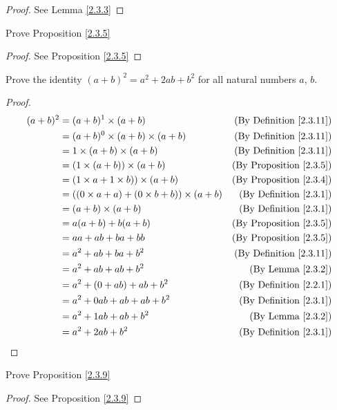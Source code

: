 \begin{proof}
See Lemma \ref{2.3.3}
\end{proof}

\begin{exercise}\label{ex 2.3.3}
Prove Proposition \ref{2.3.5}
\end{exercise}

\begin{proof}
See Proposition \ref{2.3.5}
\end{proof}

\begin{exercise}\label{ex 2.3.4}
Prove the identity \((a + b)^2 = a^2 + 2ab + b^2\) for all natural numbers \(a\), \(b\).
\end{exercise}

\begin{proof}
\begin{align*}
    (a + b)^2 &= (a + b)^1 \times (a + b) & \text{(By Definition \ref{2.3.11})} \\
    &= (a + b)^0 \times (a + b) \times (a + b) & \text{(By Definition \ref{2.3.11})} \\
    &= 1 \times (a + b) \times (a + b) & \text{(By Definition \ref{2.3.11})} \\
    &= (1 \times (a + b)) \times (a + b) & \text{(By Proposition \ref{2.3.5})} \\
    &= (1 \times a + 1 \times b)) \times (a + b) & \text{(By Proposition \ref{2.3.4})} \\
    &= ((0 \times a + a) + (0 \times b + b)) \times (a + b) & \text{(By Definition \ref{2.3.1})} \\
    &= (a + b) \times (a + b) & \text{(By Definition \ref{2.3.1})} \\
    &= a(a + b) + b(a + b) & \text{(By Proposition \ref{2.3.5})} \\
    &= aa + ab + ba + bb & \text{(By Proposition \ref{2.3.5})} \\
    &= a^2 + ab + ba + b^2 & \text{(By Definition \ref{2.3.11})} \\
    &= a^2 + ab + ab + b^2 & \text{(By Lemma \ref{2.3.2})} \\
    &= a^2 + (0 + ab) + ab + b^2 & \text{(By Definition \ref{2.2.1})} \\
    &= a^2 + 0ab + ab + ab + b^2 & \text{(By Definition \ref{2.3.1})} \\
    &= a^2 + 1ab + ab + b^2 & \text{(By Lemma \ref{2.3.2})} \\
    &= a^2 + 2ab + b^2 & \text{(By Definition \ref{2.3.1})} \\
\end{align*}
\end{proof}

\begin{exercise}\label{ex 2.3.5}
Prove Proposition \ref{2.3.9}
\end{exercise}

\begin{proof}
See Proposition \ref{2.3.9}
\end{proof}